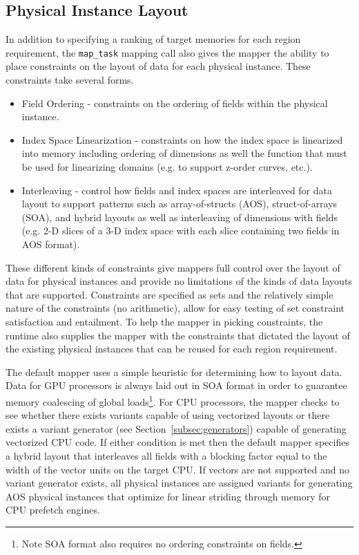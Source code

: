 \subsection{Physical Instance Layout}
\label{subsec:layout}
In addition to specifying a ranking of target memories
for each region requirement, the {\tt map\_task} mapping
call also gives the mapper the ability to place constraints
on the layout of data for each physical instance. These
constraints take several forms.
\begin{itemize}
\item Field Ordering - constraints on the ordering of fields
                       within the physical instance.
\item Index Space Linearization - constraints on how the index
                       space is linearized into memory including
                       ordering of dimensions as well the function
                       that must be used for linearizing domains
                       (e.g. to support z-order curves, etc.).
\item Interleaving - control how fields and index spaces are
                     interleaved for data layout to support
                     patterns such as array-of-structs (AOS),
                     struct-of-arrays (SOA), and hybrid layouts
                     as well as interleaving of dimensions with
                     fields (e.g. 2-D slices of a 3-D index space
                     with each slice containing two fields in
                     AOS format).
\end{itemize}
These different kinds of constraints give mappers full control
over the layout of data for physical instances and provide
no limitations of the kinds of data layouts that are supported.
Constraints are specified as sets and the relatively simple
nature of the constraints (no arithmetic), allow for easy testing
of set constraint satisfaction and entailment. To help the mapper
in picking constraints, the runtime also supplies the mapper with
the constraints that dictated the layout of the existing physical
instances that can be reused for each region requirement.

The default mapper uses a simple heuristic for determining
how to layout data. Data for GPU processors is always laid out
in SOA format in order to guarantee memory coalescing of global
loads\footnote{Note SOA format also requires no ordering constraints
on fields.}. For CPU processors, the mapper checks to see whether
there exists variants capable of using vectorized layouts or
there exists a variant generator (see Section~\ref{subsec:generators})
capable of generating vectorized CPU code. If either condition is
met then the default mapper specifies a hybrid layout that interleaves
all fields with a blocking factor equal to the width of the 
vector units on the target CPU.  If vectors are not supported
and no variant generator exists, all physical instances are
assigned variants for generating AOS physical instances that 
optimize for linear striding through memory for CPU prefetch
engines.

